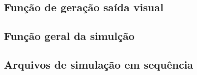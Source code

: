 \subsection{Função de geração saída visual}



\subsection{Função geral da simulção}



\subsection{Arquivos de simulação em sequência}







